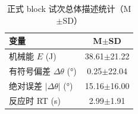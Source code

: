 \begin{table}[htbp]
  \centering
  \caption{正式 block 试次总体描述统计（M$\pm$SD）}
  \label{tab:desc-overall}
  \begin{tabular}{lc}
    \toprule
    变量 & M$\pm$SD \\
    \midrule
    机械能 $E$ (J) & 38.61$\pm$21.22 \\
    有符号偏差 $\Delta\theta$ (°) & 0.25$\pm$22.04 \\
    绝对误差 $|\Delta\theta|$ (°) & 15.16$\pm$16.00 \\
    反应时 RT (s) & 2.99$\pm$1.91 \\
    \bottomrule
  \end{tabular}
\end{table}
